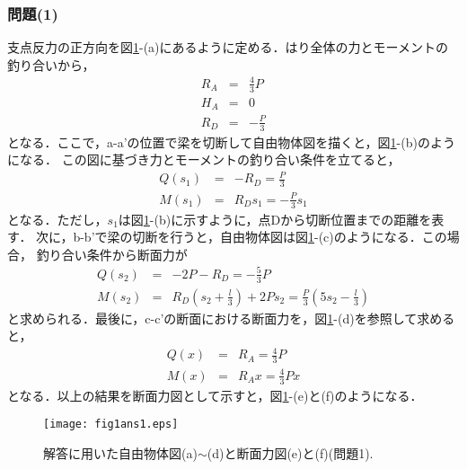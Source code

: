 \documentclass[10pt,a4j]{jarticle}
\begin{document}
\subsubsection*{問題(1)}
支点反力の正方向を図\ref{fig:fig1_1}-(a)にあるように定める．はり全体の力とモーメントの
釣り合いから，
\begin{eqnarray}
	R_A &=& \frac{4}{3}P \\
	H_A &=&0 \\
	R_D &=& -\frac{P}{3}
	\label{eqn:Rs_simple}
\end{eqnarray}
となる．ここで，a-a'の位置で梁を切断して自由物体図を描くと，図\ref{fig:fig1_1}-(b)のようになる．
この図に基づき力とモーメントの釣り合い条件を立てると，
\begin{eqnarray}
	Q(s_1) &=& -R_D= \frac{P}{3} \\
	M(s_1) &=& R_D s_1=-\frac{P}{3}s_1
	\label{eqn:eqlbl}
\end{eqnarray}
となる．ただし，$s_1$は図\ref{fig:fig1_1}-(b)に示すように，点Dから切断位置までの距離を表す．
次に，b-b'で梁の切断を行うと，自由物体図は図\ref{fig:fig1_1}-(c)のようになる．この場合，
釣り合い条件から断面力が
\begin{eqnarray}
	Q(s_2) &=& -2P-R_D=-\frac{5}{3}P \\ 
	M(s_2) &=& R_D\left(s_2+\frac{l}{3}\right) +2Ps_2 = \frac{P}{3} \left( 5s_2-\frac{l}{3}\right)
	\label{eqn:eqlbl}
\end{eqnarray}
と求められる．最後に，c-c'の断面における断面力を，図\ref{fig:fig1_1}-(d)を参照して求めると，
\begin{eqnarray}
	Q(x) &=&R_A=\frac{4}{3}P \\ 
	M(x) &=&R_Ax = \frac{4}{3}Px 
	\label{eqn:eqlbl}
\end{eqnarray}
となる．以上の結果を断面力図として示すと，図\ref{fig:fig1_1}-(e)と(f)のようになる．
\begin{figure}[h]
	\begin{center}
	\texttt{[image: fig1ans1.eps]} 
	\end{center}
	\caption{解答に用いた自由物体図(a)$\sim$(d)と断面力図(e)と(f)(問題1).} 
	\label{fig:fig1_1}
\end{figure}
\end{document}
